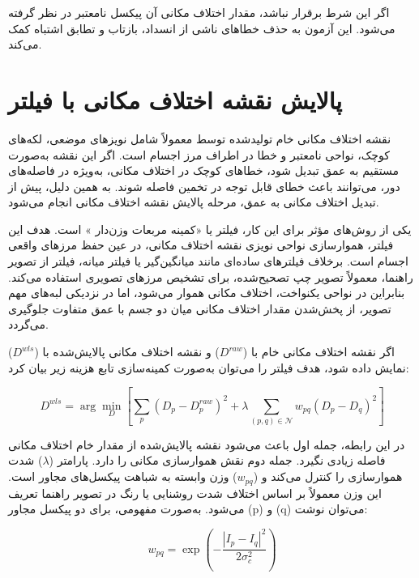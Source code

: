 اگر این شرط برقرار نباشد، مقدار اختلاف مکانی آن پیکسل نامعتبر در نظر گرفته می‌شود. این آزمون به حذف خطاهای ناشی از انسداد، بازتاب و تطابق اشتباه کمک می‌کند.
\section{پالایش نقشه اختلاف مکانی با فیلتر }

نقشه اختلاف مکانی خام تولیدشده توسط  معمولاً شامل نویزهای موضعی، لکه‌های کوچک، نواحی نامعتبر و خطا در اطراف مرز اجسام است. اگر این نقشه به‌صورت مستقیم به عمق تبدیل شود، خطاهای کوچک در اختلاف مکانی، به‌ویژه در فاصله‌های دور، می‌توانند باعث خطای قابل توجه در تخمین فاصله شوند. به همین دلیل، پیش از تبدیل اختلاف مکانی به عمق، مرحله پالایش نقشه اختلاف مکانی انجام می‌شود.

یکی از روش‌های مؤثر برای این کار، فیلتر  یا «کمینه مربعات وزن‌دار%
»
است. هدف این فیلتر، هموارسازی نواحی نویزی نقشه اختلاف مکانی، در عین حفظ مرزهای واقعی اجسام است. برخلاف فیلترهای ساده‌ای مانند میانگین‌گیر یا فیلتر میانه، فیلتر  از تصویر راهنما، معمولاً تصویر چپ تصحیح‌شده، برای تشخیص مرزهای تصویری استفاده می‌کند. بنابراین در نواحی یکنواخت، اختلاف مکانی هموار می‌شود، اما در نزدیکی لبه‌های مهم تصویر، از پخش‌شدن مقدار اختلاف مکانی میان دو جسم با عمق متفاوت جلوگیری می‌گردد.

اگر نقشه اختلاف مکانی خام با ($D^{raw}$) و نقشه اختلاف مکانی پالایش‌شده با ($D^{wls}$) نمایش داده شود، هدف فیلتر  را می‌توان به‌صورت کمینه‌سازی تابع هزینه زیر بیان کرد:

\begin{equation}
	D^{wls}
	=
	\arg\min_D
	\left[
	\sum_{p}
	\left(
	D_p - D_p^{raw}
	\right)^2
	+
	\lambda
	\sum_{(p,q)\in \mathcal{N}}
	w_{pq}
	\left(
	D_p-D_q
	\right)^2
	\right]
	\label{eq:wls_disparity_energy}
\end{equation}

در این رابطه، جمله اول باعث می‌شود نقشه پالایش‌شده از مقدار خام اختلاف مکانی فاصله زیادی نگیرد. جمله دوم نقش هموارسازی مکانی را دارد. پارامتر ($\lambda$) شدت هموارسازی را کنترل می‌کند و ($w_{pq}$) وزن وابسته به شباهت پیکسل‌های مجاور است. این وزن معمولاً بر اساس اختلاف شدت روشنایی یا رنگ در تصویر راهنما تعریف می‌شود. به‌صورت مفهومی، برای دو پیکسل مجاور (p) و (q) می‌توان نوشت:

\begin{equation}
	w_{pq}
	=
	\exp
	\left(
	-
	\frac{
		\left|
		I_p-I_q
		\right|^2
	}{
		2\sigma_c^2
	}
	\right)
	\label{eq:wls_edge_weight}
\end{equation}

